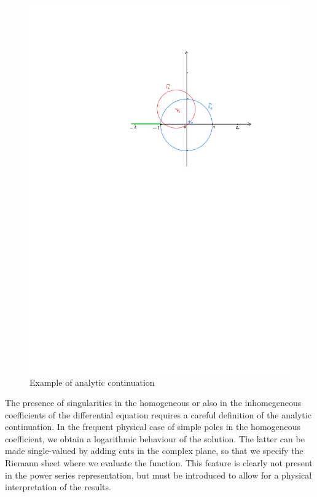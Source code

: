 \begin{figure}
\includegraphics[scale=0.65]{continuazione-analitica.pdf}
\caption{\label{fig:analcont}
  Example of analytic continuation}
\end{figure}

The presence of singularities in the homogeneous or also in the inhomegeneous
coefficients of the differential equation
requires a careful definition of the analytic continuation.
In the frequent physical case of simple poles in the homogeneous coefficient,
we obtain a logarithmic behaviour of the solution.
The latter can be made single-valued
by adding cuts in the complex plane,
so that we specify the Riemann sheet where we evaluate the function.
This feature is clearly not present in the power series representation,
but must be introduced to allow for a physical interpretation of the results.


